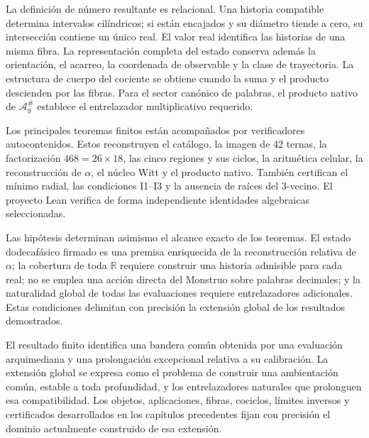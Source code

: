La definición de número resultante es relacional. Una historia compatible
determina intervalos cilíndricos; si están encajados y su diámetro tiende a
cero, su intersección contiene un único real. El valor real identifica las
historias de una misma fibra. La representación completa del estado conserva
además la orientación, el acarreo, la coordenada de observable y la clase de
trayectoria. La estructura de cuerpo del cociente se obtiene cuando la suma y
el producto descienden por las fibras. Para el sector canónico de palabras,
el producto nativo de \(\mathcal A_9^\#\) establece el entrelazador
multiplicativo requerido.

Los principales teoremas finitos están acompañados por verificadores
autocontenidos. Estos reconstruyen el catálogo, la imagen de 42 ternas, la
factorización \(468=26\times18\), las cinco regiones y sus ciclos, la
aritmética celular, la reconstrucción de \(\alpha\), el núcleo Witt y el
producto nativo. También certifican el mínimo radial, las condiciones I1--I3
y la ausencia de raíces del 3-vecino. El proyecto Lean verifica de forma
independiente identidades algebraicas seleccionadas.

Las hipótesis determinan asimismo el alcance exacto de los teoremas. El estado
dodecafásico firmado es una premisa enriquecida de la reconstrucción relativa
de \(\alpha\); la cobertura de toda \(\mathbb R\) requiere construir una
historia admisible para cada real; no se emplea una acción directa del
Monstruo sobre palabras decimales; y la naturalidad global de todas las
evaluaciones requiere entrelazadores adicionales. Estas condiciones delimitan
con precisión la extensión global de los resultados demostrados.

El resultado finito identifica una bandera común obtenida por una evaluación
arquimediana y una prolongación excepcional relativa a su calibración. La
extensión global se expresa como el problema de construir una ambientación común,
estable a toda profundidad, y los entrelazadores naturales que prolonguen esa
compatibilidad. Los objetos, aplicaciones, fibras, cociclos, límites inversos
y certificados desarrollados en los capítulos precedentes fijan con precisión
el dominio actualmente construido de esa extensión.
